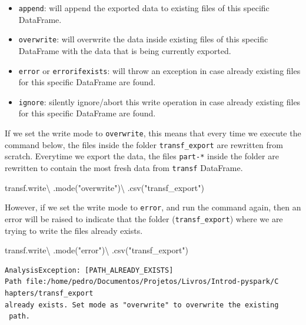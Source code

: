 \documentclass[
  11pt,
  letterpaper,
  DIV=11,
  numbers=noendperiod]{scrreprt}
\newenvironment{Shaded}{\begin{snugshade}}{\end{snugshade}}
\newcommand{\NormalTok}[1]{\textcolor[rgb]{0.00,0.23,0.31}{#1}}
\newcommand{\OperatorTok}[1]{\textcolor[rgb]{0.37,0.37,0.37}{#1}}
\newcommand{\StringTok}[1]{\textcolor[rgb]{0.13,0.47,0.30}{#1}}
\providecommand{\tightlist}{%
  \setlength{\itemsep}{0pt}\setlength{\parskip}{0pt}}\usepackage{longtable,booktabs,array}
\begin{document}
\begin{itemize}
\tightlist
\item
  \texttt{append}: will append the exported data to existing files of
  this specific DataFrame.
\item
  \texttt{overwrite}: will overwrite the data inside existing files of
  this specific DataFrame with the data that is being currently
  exported.
\item
  \texttt{error} or \texttt{errorifexists}: will throw an exception in
  case already existing files for this specific DataFrame are found.
\item
  \texttt{ignore}: silently ignore/abort this write operation in case
  already existing files for this specific DataFrame are found.
\end{itemize}

If we set the write mode to \texttt{overwrite}, this means that every
time we execute the command below, the files inside the folder
\texttt{transf\_export} are rewritten from scratch. Everytime we export
the data, the files \texttt{part-*} inside the folder are rewritten to
contain the most fresh data from \texttt{transf} DataFrame.

\begin{Shaded}
\begin{Highlighting}[]
\NormalTok{transf.write}\OperatorTok{\textbackslash{}}
\NormalTok{    .mode(}\StringTok{"overwrite"}\NormalTok{)}\OperatorTok{\textbackslash{}}
\NormalTok{    .csv(}\StringTok{"transf\_export"}\NormalTok{)}
\end{Highlighting}
\end{Shaded}

However, if we set the write mode to \texttt{error}, and run the command
again, then an error will be raised to indicate that the folder
(\texttt{transf\_export}) where we are trying to write the files already
exists.

\begin{Shaded}
\begin{Highlighting}[]
\NormalTok{transf.write}\OperatorTok{\textbackslash{}}
\NormalTok{    .mode(}\StringTok{"error"}\NormalTok{)}\OperatorTok{\textbackslash{}}
\NormalTok{    .csv(}\StringTok{"transf\_export"}\NormalTok{)}
\end{Highlighting}
\end{Shaded}

\begin{verbatim}
AnalysisException: [PATH_ALREADY_EXISTS]
Path file:/home/pedro/Documentos/Projetos/Livros/Introd-pyspark/C
hapters/transf_export
already exists. Set mode as "overwrite" to overwrite the existing
 path.
\end{verbatim}
\end{document}
